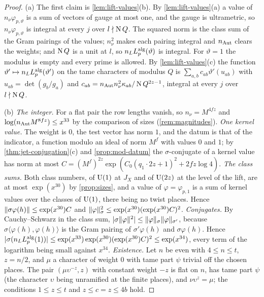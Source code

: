 \begin{proof}
(a) The first claim is \cref{lem:lift-values}(b). By \cref{lem:lift-values}(a) a value of $n_\nu\varphi_{p,\vartheta}$ is a sum of vectors of gauge at most one, and the gauge is ultrametric, so $n_\nu\varphi_{p,\vartheta}$ is integral at every $j$ over
$l\nmid\operatorname{N} Q$. The squared norm is the class sum of the Gram pairings of the values; $n_\nu^2$ makes each pairing integral and $n_{\rm Aut}$ clears the weights; and $\operatorname{N} Q$ is a unit at $l$, so $n_LL^{\rm alg}_p(\vartheta)$ is
integral. For $\vartheta=1$ the modulus is empty and every prime is allowed. By \cref{lem:lift-values}(c) the function $\vartheta'\mapsto n_LL^{\rm alg}_p(\vartheta')$ on the tame characters of modulus $Q$ is $\sum_{a,b}c_{ab}\vartheta'(u_{ab})$ with
$u_{ab}=\det(g_b/g_a)$ and $c_{ab}=n_{\rm Aut}n_\nu^2\kappa_{ab}/\operatorname{N} Q^{2z-1}$, integral at every $j$ over $l\nmid\operatorname{N} Q$.

(b) \emph{The integer.} For a flat pair the row lengths vanish, so $n_\nu=M^{4fz}$ and $\log(n_{\rm Aut}M^{8fz})\le x^{33}$ by the comparison of sizes (\cref{rem:magnitudes}). \emph{One kernel value.} The weight is $0$, the test vector has
norm $1$, and the datum is that of the indicator, a function modulo an ideal of norm $M^f$ with values $0$ and $1$; by \cref{thm:jet-conjugation}(c) and \cref{prop:mod-datum} the $\sigma$-conjugate of a kernel value has norm at most
$C=(M^f)^{2z}\exp(C_0(q_1\cdot2z+1)^2+2fz\log4)$. \emph{The class sums.} Both class numbers, of $\operatorname{U}(1)$ at $J_X$ and of $\operatorname{U}(2z)$ at the level of the lift, are at most $\exp(x^{30})$ by \cref{prop:sizes}, and a value of $\varphi=\varphi_{p,1}$ is a
sum of kernel values over the classes of $\operatorname{U}(1)$, there being no twist places. Hence $\lVert \sigma\varphi(h)\rVert\le\exp(x^{30})C$ and $\lVert \varphi\rVert_\sigma^2\le\exp(x^{30})(\exp(x^{30})C)^2$. \emph{Conjugates.} By Cauchy--Schwarz in the class sum,
$\lvert \sigma\lVert \varphi\rVert^2\rvert\le\lVert \varphi\rVert_{\sigma}\lVert \varphi\rVert_{\sigma'}$, because $\sigma\langle\varphi(h),\varphi(h)\rangle$ is the Gram pairing of $\sigma'\varphi(h)$ and $\sigma\varphi(h)$. Hence
$\lvert \sigma(n_LL^{\rm alg}_p(1))\rvert\le\exp(x^{33})\exp(x^{30})(\exp(x^{30})C)^2\le\exp(x^{34})$, every term of the logarithm being small against $x^{34}$. \emph{Existence.} Let $n$ be even with $4\le n\le t$, $z=n/2$, and $\mu$ a
character of weight $0$ with tame part $\psi$ trivial off the chosen places. The pair $(\mu\upsilon^{-z},z)$ with constant weight $-z$ is flat on $n$, has tame part $\psi$ (the character $\upsilon$ being unramified at the finite
places), and $\nu\upsilon^z=\mu$; the conditions $1\le z\le t$ and $z\le c=z\le4b$ hold.


\end{proof}
